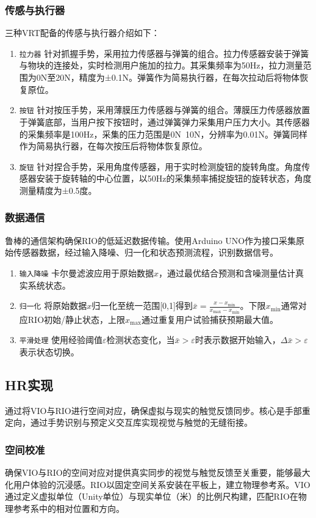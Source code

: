 \documentclass[runningheads]{llncs}
\begin{document}
\subsubsection{传感与执行器}
三种VRT配备的传感与执行器介绍如下：
\begin{enumerate}[label={\arabic*)}]
  \item \texttt{拉力器} 针对抓握手势，采用拉力传感器与弹簧的组合。拉力传感器安装于弹簧与物块的连接处，实时检测用户施加的拉力。其采集频率为50Hz，拉力测量范围为0N至20N，精度为±0.1N。弹簧作为简易执行器，在每次拉动后将物体恢复原位。
  \item \texttt{按钮} 针对按压手势，采用薄膜压力传感器与弹簧的组合。薄膜压力传感器放置于弹簧底部，当用户按下按钮时，通过弹簧弹力采集用户压力大小。其传感器的采集频率是100Hz，采集的压力范围是0N~10N，分辨率为0.01N。弹簧同样作为简易执行器，在每次按压后将物体恢复原位。
  \item \texttt{旋钮} 针对捏合手势，采用角度传感器，用于实时检测旋钮的旋转角度。角度传感器安装于旋转轴的中心位置，以50Hz的采集频率捕捉旋钮的旋转状态，角度测量精度为±0.5度。
\end{enumerate}

\subsubsection{数据通信}
鲁棒的通信架构确保RIO的低延迟数据传输。使用Arduino UNO作为接口采集原始传感器数据，经过输入降噪、归一化和状态预测流程，识别数据信号。
\begin{enumerate}
  \item \texttt{输入降噪} 卡尔曼滤波应用于原始数据$x$，通过最优结合预测和含噪测量估计真实系统状态。
  \item \texttt{归一化} 将原始数据$x$归一化至统一范围[0,1]得到$\bar{x}=\displaystyle\frac{x-x_{\min}}{x_{\max}-x_{\min}}$。下限$x_{\min}$通常对应RIO初始/静止状态，上限$x_{\max}$通过重复用户试验捕获预期最大值。
  \item \texttt{平滑处理} 使用经验阈值$\varepsilon$检测状态变化，当$\bar{x}>\varepsilon$时表示数据开始输入，$\Delta\bar{x}>\varepsilon$表示状态切换。
\end{enumerate}

\subsection{HR实现}
通过将VIO与RIO进行空间对应，确保虚拟与现实的触觉反馈同步。核心是手部重定向，通过手势识别与预定义交互库实现视觉与触觉的无缝衔接。

\subsubsection{空间校准}
确保VIO与RIO的空间对应对提供真实同步的视觉与触觉反馈至关重要，能够最大化用户体验的沉浸感。RIO以固定空间关系安装在平板上，建立物理参考系。VIO通过定义虚拟单位（Unity单位）与现实单位（米）的比例尺构建，匹配RIO在物理参考系中的相对位置和方向。
\end{document}

